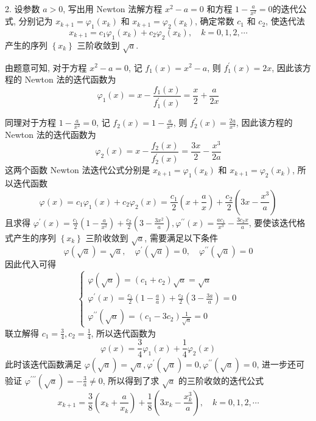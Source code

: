 \begin{tcolorbox}[enhanced,colback=green!10!white,colframe=green!50!white,breakable,coltitle=green!25!black,title=2024]

2. 设参数 $ a>0 $, 写出用 Newton 法解方程 $ x^{2}-a=0 $ 和方程 $ 1-\frac{a}{x^{2}}=0 $的迭代公式, 分别记为 $ x_{k+1}=\varphi_{1}\left(x_{k}\right) $ 和 $ x_{k+1}=\varphi_{2}\left(x_{k}\right) $, 确定常数 $ c_{1} $ 和 $ c_{2} $, 使迭代法
$$
x_{k+1}=c_{1} \varphi_{1}\left(x_{k}\right)+c_{2} \varphi_{2}\left(x_{k}\right), \quad k=0,1,2, \cdots
$$
产生的序列 $ \left\{x_{k}\right\} $ 三阶收敛到 $ \sqrt{a} $.

 \tcblower
 由题意可知, 对于方程 $ x^{2}-a=0 $, 记 $ f_{1}(x)=x^{2}-a $, 则 $ f_{1}^{\prime}(x)=2 x $, 因此该方程的 Newton 法的迭代函数为
$$
\varphi_{1}(x)=x-\frac{f_{1}(x)}{f_{1}^{\prime}(x)}=\frac{x}{2}+\frac{a}{2 x}
$$

同理对于方程 $ 1-\frac{a}{x^{2}}=0 $, 记 $ f_{2}(x)=1-\frac{a}{x^{2}} $, 则 $ f_{2}^{\prime}(x)=\frac{2 a}{x^{3}} $, 因此该方程的 Newton 法的迭代函数为
$$
\varphi_{2}(x)=x-\frac{f_{2}(x)}{f_{2}^{\prime}(x)}=\frac{3 x}{2}-\frac{x^{3}}{2 a}
$$
这两个函数 Newton 法迭代公式分别是 $ x_{k+1}=\varphi_{1}\left(x_{k}\right) $ 和 $ x_{k+1}=\varphi_{2}\left(x_{k}\right) $, 所以迭代函数
$$
\varphi(x)=c_{1} \varphi_{1}(x)+c_{2} \varphi_{2}(x)=\frac{c_{1}}{2}\left(x+\frac{a}{x}\right)+\frac{c_{2}}{2}\left(3 x-\frac{x^{3}}{a}\right)
$$
且求得 $ \varphi^{\prime}(x)=\frac{c_{1}}{2}\left(1-\frac{a}{x^{2}}\right)+\frac{c_{2}}{2}\left(3-\frac{3 x^{2}}{a}\right), \varphi^{\prime \prime}(x)=\frac{a c_{1}}{x^{3}}-\frac{3 c_{2} x}{a} $, 要使该迭代格式产生的序列 $ \left\{x_{k}\right\} $ 三阶收敛到 $ \sqrt{a} $, 需要满足以下条件
$$
\varphi(\sqrt{a})=\sqrt{a}, \quad \varphi^{\prime}(\sqrt{a})=0, \quad \varphi^{\prime \prime}(\sqrt{a})=0
$$
因此代入可得
$$
\left\{\begin{array}{l}
\varphi(\sqrt{a})=\left(c_{1}+c_{2}\right) \sqrt{a}=\sqrt{a} \\
\varphi^{\prime}(x)=\frac{c_{1}}{2}\left(1-\frac{a}{a}\right)+\frac{c_{2}}{2}\left(3-\frac{3 a}{a}\right)=0 \\
\varphi^{\prime \prime}(\sqrt{a})=\left(c_{1}-3 c_{2}\right) \frac{1}{\sqrt{a}}=0
\end{array}\right.
$$
联立解得 $ c_{1}=\frac{3}{4}, c_{2}=\frac{1}{4} $, 所以迭代函数为
$$
\varphi(x)=\frac{3}{4} \varphi_{1}(x)+\frac{1}{4} \varphi_{2}(x)
$$
此时该迭代函数满足 $ \varphi(\sqrt{a})=\sqrt{a}, \varphi^{\prime}(\sqrt{a})=0, \varphi^{\prime \prime}(\sqrt{a})=0 $, 进一步还可验证 $ \varphi^{\prime \prime \prime}(\sqrt{a})=-\frac{3}{a} \neq 0 $, 所以得到了求 $ \sqrt{a} $ 的三阶收敛的迭代公式
$$
x_{k+1}=\frac{3}{8}\left(x_{k}+\frac{a}{x_{k}}\right)+\frac{1}{8}\left(3 x_{k}-\frac{x_{k}^{3}}{a}\right), \quad k=0,1,2, \cdots
$$
 \end{tcolorbox}


